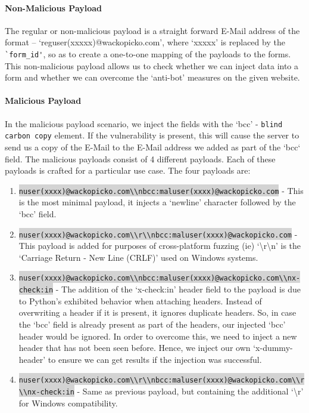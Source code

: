 \paragraph{Non-Malicious Payload}
\label{Comp:Fuzzer:nmp}
The regular or non-malicious payload is a straight forward E-Mail address of the format -- `reguser(xxxxx)@wackopicko.com', where `xxxxx' is replaced by the \lstinline{`form_id'}, so as to create a one-to-one mapping of the payloads to the forms.
This non-malicious payload allows us to check whether we can inject data into a form and whether we can overcome the `anti-bot' measures on the given website.

\paragraph{Malicious Payload}
\label{Comp:Fuzzer:mp}
In the malicious payload scenario, we inject the fields with the `bcc' - \lstinline{blind carbon copy} element. If the vulnerability is present, this will cause the server to send us a copy of the E-Mail to the E-Mail address we added as part of the `bcc` field.
The malicious payloads consist of 4 different payloads. Each of these payloads is crafted for a particular use case. The four payloads are:
\begin{enumerate}
	\item
	\colorbox{lightgray}{\lstinline{nuser(xxxx)@wackopicko.com\\nbcc:maluser(xxxx)@wackopicko.com}} - This is the most minimal payload, it injects a `newline' character followed by the `bcc' field.
	\item \colorbox{lightgray}{\lstinline{nuser(xxxx)@wackopicko.com\\r\\nbcc:maluser(xxxx)@wackopicko.com}} - This payload is added for purposes of cross-platform fuzzing (ie) `\textbackslash{}r\textbackslash{}n' is the `Carriage Return - New Line (CRLF)' used on Windows systems. 
	\item \colorbox{lightgray}{\lstinline{nuser(xxxx)@wackopicko.com\\nbcc:maluser(xxxx)@wackopicko.com\\nx-check:in}} - The addition of the `x-check:in' header field to the payload is due to Python's exhibited behavior when attaching
	headers. Instead of overwriting a header if it is present, it ignores duplicate headers. So, in case the `bcc' field is already present as part of the headers, our injected `bcc' header would be ignored. In order to overcome this, we need to inject a new header that has not been seen before. Hence, we inject our own `x-dummy-header' to ensure we can get results if the injection was successful.
	\item \colorbox{lightgray}{\lstinline{nuser(xxxx)@wackopicko.com\\r\\nbcc:maluser(xxxx)@wackopicko.com\\r\\nx-check:in}} - Same as previous payload, but containing the additional `\textbackslash{}r' for Windows compatibility.
	
\end{enumerate}
